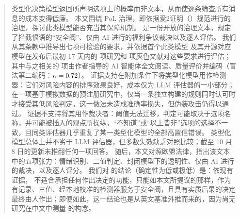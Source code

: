 \begin{abstract}
类型化决策模型返回所声明选项上的概率而非文本，从而使逐条筛查所有消息的成本变得低廉。
本文围绕 PoL 治理，即依据爱2证明（\pol{}）规范进行的治理，探讨此类模型能否充当其保障机制。\pol{} 是一份开放的治理文本，规定了拦截恨语的“安全阀”、仅由 AI 进行的福利争议裁决以及逐人评估。
我们从其条款中推导出七项可检验的要求，并依据首个此类模型 \jev{} 及其开源对应模型在发布后最初 17 天内的 \nPapers{} 项研究和 \nGrey{} 项灰色文献对这些要求进行评估；其中与之相关的 \nCoded{} 项由作者指导的 AI 智能体全文阅读、质量评价并编码（盲法第二编码：$\kappa = \nKappa{}$）。
证据支持在附加条件下将类型化模型用作检测器：它们对风险内容的排序效果良好，成本仅为 LLM 评估器的一小部分；在一项基于模拟数据的预注册研究中，仅当一条独立构建的规则同时认可时才接受其低风险判定，这一做法未造成准确率损失，但伪装攻击仍得以通过。
证据不支持将其用作裁决者：阈值无法迁移，判定可能取决于选项名称，并可能被插入的观点所操纵，“不知道”或“以上皆非”选项的选择不一致，且同类评估器几乎重复了某一类型化模型的全部高置信错误。
类型化模型总体上并不劣于 LLM 评估器，但多数失效缺乏对照比较；截至 10 月 8 日的更新未推翻任何一项回答。
随后，本文对照欧盟法律，指出该文本中的五项张力：情绪识别、二值判定、封闭模型下的透明性、仅由 AI 进行的裁决，以及逐人评分。
我们对 \pol{} 的结论（确定性为低或极低）是：依现有证据，\jev{} 不适合承担任何作出决定的功能，只能如本文所提议的那样，作为有记录、三值、经本地校准的检测器服务于安全阀，且具有实质后果的决定最终由人作出；即便如此，这一结论也是从英文基准外推而来的，因为尚无研究在中文中测量 \pol{} 的构念。
\end{abstract}
